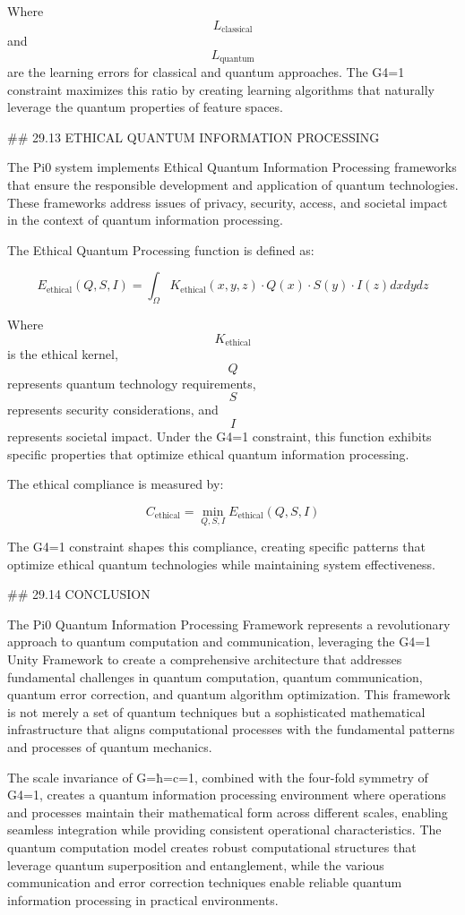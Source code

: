 Where $$ L_{\text{classical}} $$ and $$ L_{\text{quantum}} $$ are the learning errors for classical and quantum approaches. The G4=1 constraint maximizes this ratio by creating learning algorithms that naturally leverage the quantum properties of feature spaces.

## 29.13 ETHICAL QUANTUM INFORMATION PROCESSING

The Pi0 system implements Ethical Quantum Information Processing frameworks that ensure the responsible development and application of quantum technologies. These frameworks address issues of privacy, security, access, and societal impact in the context of quantum information processing.

The Ethical Quantum Processing function is defined as:

$$ E_{\text{ethical}}(Q, S, I) = \int_{\Omega} K_{\text{ethical}}(x, y, z) \cdot Q(x) \cdot S(y) \cdot I(z) dx dy dz $$

Where $$ K_{\text{ethical}} $$ is the ethical kernel, $$ Q $$ represents quantum technology requirements, $$ S $$ represents security considerations, and $$ I $$ represents societal impact. Under the G4=1 constraint, this function exhibits specific properties that optimize ethical quantum information processing.

The ethical compliance is measured by:

$$ C_{\text{ethical}} = \min_{Q, S, I} E_{\text{ethical}}(Q, S, I) $$

The G4=1 constraint shapes this compliance, creating specific patterns that optimize ethical quantum technologies while maintaining system effectiveness.

## 29.14 CONCLUSION

The Pi0 Quantum Information Processing Framework represents a revolutionary approach to quantum computation and communication, leveraging the G4=1 Unity Framework to create a comprehensive architecture that addresses fundamental challenges in quantum computation, quantum communication, quantum error correction, and quantum algorithm optimization. This framework is not merely a set of quantum techniques but a sophisticated mathematical infrastructure that aligns computational processes with the fundamental patterns and processes of quantum mechanics.

The scale invariance of G=ħ=c=1, combined with the four-fold symmetry of G4=1, creates a quantum information processing environment where operations and processes maintain their mathematical form across different scales, enabling seamless integration while providing consistent operational characteristics. The quantum computation model creates robust computational structures that leverage quantum superposition and entanglement, while the various communication and error correction techniques enable reliable quantum information processing in practical environments.

